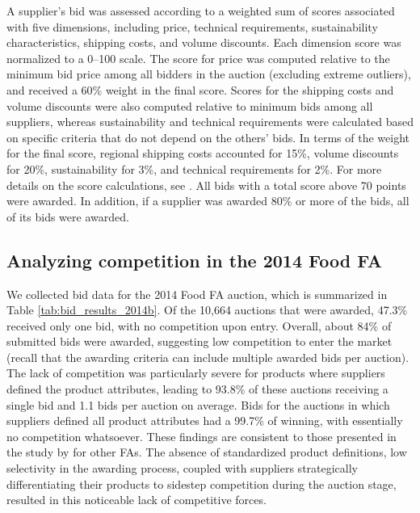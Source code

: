 % 


 
  
   A supplier's bid was assessed according to a weighted sum of scores associated with five dimensions, including price, technical requirements, sustainability characteristics, shipping costs, and volume discounts. Each dimension score was normalized to a 0--100 scale. The score for price was computed relative to the minimum bid price among all bidders in the auction (excluding extreme outliers), and received a 60\% weight in the final score. Scores for the shipping costs and volume discounts were also computed relative to minimum bids among all suppliers, whereas sustainability and technical requirements were calculated based on specific criteria that do not depend on the others' bids. In terms of the weight for the final score, regional shipping costs accounted for 15\%, volume discounts for 20\%, sustainability for 3\%, and technical requirements for 2\%. For more details on the score calculations, see \cite{levy2017rediseno}. All bids with a total score above 70 points were awarded. In addition, if a supplier was awarded 80\% or more of the bids, all of its bids were awarded.

%
%


\subsection{{Analyzing competition in the 2014 Food FA} }  \label{se:noncomp}

We collected bid data for the 2014 Food FA auction, which is summarized in Table \ref{tab:bid_results_2014b}. {Of the 10,664 auctions that were awarded,  47.3\% received only one bid, with no competition upon entry. Overall, about 84\% of submitted bids were awarded, suggesting low competition to enter the market (recall that the awarding criteria can include multiple awarded bids per auction). The lack of competition was particularly severe for products where suppliers defined the product attributes, leading to 93.8\% of these auctions receiving a single bid and 1.1 bids per auction on average. Bids for the  auctions in which suppliers defined {all} product attributes had a 99.7\% of winning, with essentially no competition whatsoever. These findings are consistent to those presented in the study by  \cite{oecd2017Chile} for other FAs. The absence of standardized product definitions, low selectivity in the awarding process, coupled with suppliers strategically differentiating  their products to sidestep competition during the auction stage,  resulted in this noticeable lack of competitive forces.}


